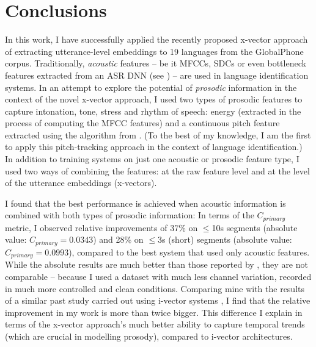 \documentclass[bsc,frontabs,twoside,singlespacing,parskip,deptreport]{infthesis}
\begin{document}
{  \section{Conclusions}{
    \label{sec:conclusions}
    In this work, I have successfully applied the recently proposed x-vector approach of extracting utterance-level embeddings \citep{Snyder_et_al_2018} to 19 languages from the GlobalPhone corpus. Traditionally, \textit{acoustic} features -- be it MFCCs, SDCs or even bottleneck features extracted from an ASR DNN (see \citet{Snyder_et_al_2018}) -- are used in language identification systems.
    In an attempt to explore the potential of \textit{prosodic} information in the context of the novel x-vector approach, I used two types of prosodic features to capture intonation, tone, stress and rhythm of speech: energy (extracted in the process of computing the MFCC features) and a continuous pitch feature extracted using the algorithm from \citet{Ghahremani_et_al_2014}. (To the best of my knowledge, I am the first to apply this pitch-tracking approach in the context of language identification.) 
    In addition to training systems on just one acoustic or prosodic feature type, I used two ways of combining the features: at the raw feature level and at the level of the utterance embeddings (x-vectors).
    
    I found that the best performance is achieved when acoustic information is combined with both types of prosodic information: In terms of the $C_{primary}$ metric, I observed relative improvements of 37\% on $\leq$10s segments (absolute value: $C_{primary}=0.0343$) and 28\% on $\leq$3s (short) segments (absolute value: $C_{primary}=0.0993$), compared to the best system that used only acoustic features.
    While the absolute results are much better than those reported by \citet{Snyder_et_al_2018}, they are not comparable -- because I used a dataset with much less channel variation, recorded in much more controlled and clean conditions.
    Comparing mine with the results of a similar past study carried out using i-vector systems \citep{Martinez_et_al_2012}, I find that the relative improvement in my work is more than twice bigger. This difference I explain in terms of the x-vector approach's much better ability to capture temporal trends (which are crucial in modelling prosody), compared to i-vector architectures.

}}
\end{document}
